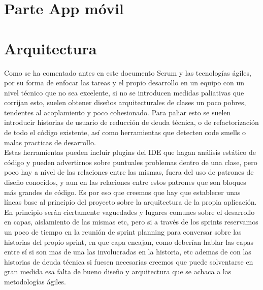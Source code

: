 \documentclass[../pfc.tex]{subfiles}
\begin{document}
	
	
	\section{Parte App móvil}
	
	\section{Arquitectura}
	
	Como se ha comentado antes en este documento Scrum y las tecnologías ágiles, por su forma de enfocar las tareas y el propio desarrollo en un equipo con un nivel técnico que no sea excelente, si no se introducen medidas paliativas que corrijan esto, suelen obtener diseños arquitecturales de clases un poco pobres, tendentes al acoplamiento y poco cohesionado. Para paliar esto se suelen introducir historias de usuario de reducción de deuda técnica, o de refactorización de todo el código existente, así como herramientas que detecten code smells\cite{refactoring} o malas practicas de desarrollo.\\ 
	
	Estas herramientas pueden incluir plugins del IDE que hagan análisis estático de código y pueden advertirnos sobre puntuales problemas dentro de una clase, pero poco hay a nivel de las relaciones entre las mismas, fuera del uso de patrones de diseño conocidos, y aun en las relaciones entre estos patrones que son bloques más grandes de código. Es por eso que creemos que hay que establecer unas líneas base al principio del proyecto sobre la arquitectura de la propia aplicación. En principio serán ciertamente vaguedades y lugares comunes sobre el desarrollo en capas, aislamiento de las mismas etc, pero si a través de los sprints reservamos un poco de tiempo en la reunión de sprint planning para conversar sobre las historias del propio sprint, en que capa encajan, como deberían hablar las capas entre sí si son mas de una las involucradas en la historia, etc ademas de con las historias de deuda técnica si fuesen necesarias creemos que puede solventarse en gran medida esa falta de bueno diseño y arquitectura que se achaca a las metodologías ágiles.\\
	
\end{document}
